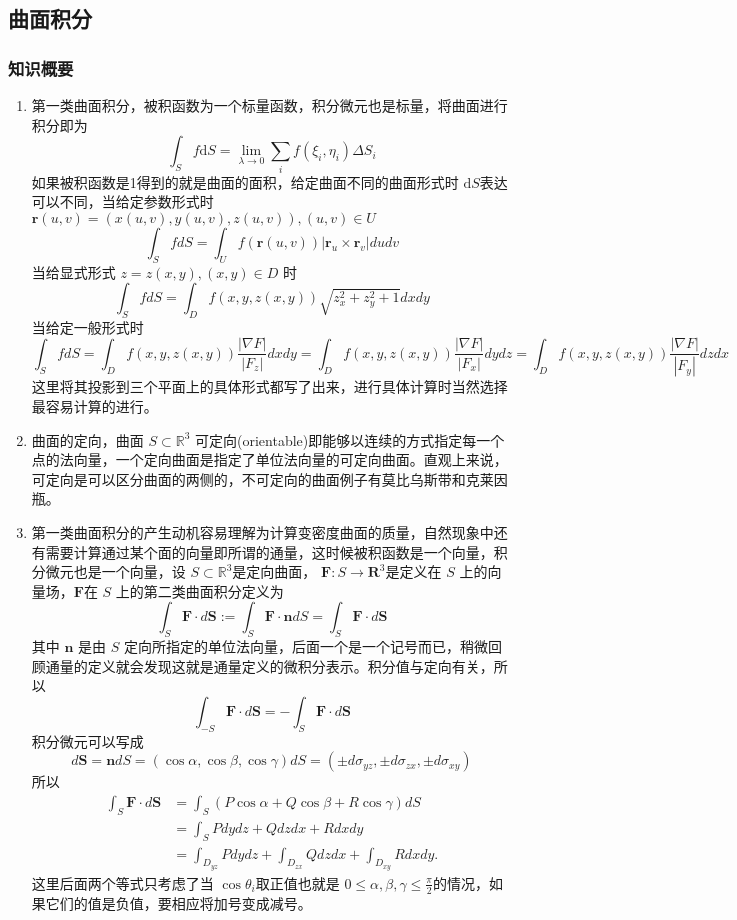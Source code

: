 \subsection{曲面积分}
\subsubsection{知识概要}
\begin{enumerate}
    \item 第一类曲面积分，被积函数为一个标量函数，积分微元也是标量，将曲面进行积分即为
    \[
        \int _S f \mathrm{d} S = \lim_{\lambda\to 0}\sum_if(\xi_i,\eta_i)\Delta S_i
    \]
    如果被积函数是1得到的就是曲面的面积，给定曲面不同的曲面形式时 $\mathrm{d} S$表达可以不同，当给定参数形式时 $\mathbf{r}(u,v)=(x(u,v),y(u,v),z(u,v)),(u,v)\in U$
    \[
        \int _S f dS=\int_Uf(\mathbf{r}(u,v))|\mathbf{r}_u\times\mathbf{r}_v|dudv
    \]
    当给显式形式 $z = z(x,y), (x,y) \in D$ 时
    \[
        \int_SfdS=\int_Df(x,y,z(x,y))\sqrt{z_x^2+z_y^2+1}dxdy
    \]
    当给定一般形式时
    \[
        \int _SfdS=\int_Df(x,y,z(x,y))\frac{|\nabla F|}{|F_z|}dxdy =\int_Df(x,y,z(x,y))\frac{|\nabla F|}{|F_x|}dydz =\int _Df(x,y,z(x,y))\frac{|\nabla F|}{|F_y|}dzdx  
    \]
    这里将其投影到三个平面上的具体形式都写了出来，进行具体计算时当然选择最容易计算的进行。

    \item 曲面的定向，曲面 $S \subset \mathbb{R}^3$ 可定向(orientable)即能够以连续的方式指定每一个点的法向量，一个定向曲面是指定了单位法向量的可定向曲面。直观上来说，可定向是可以区分曲面的两侧的，不可定向的曲面例子有莫比乌斯带和克莱因瓶。

    \item 第一类曲面积分的产生动机容易理解为计算变密度曲面的质量，自然现象中还有需要计算通过某个面的向量即所谓的通量，这时候被积函数是一个向量，积分微元也是一个向量，设 $S \subset \mathbb{R}^3$是定向曲面， $\mathbf{F}: S \to \mathbf{R}^3$是定义在 $S$ 上的向量场，$\mathbf{F}$在 $S$ 上的第二类曲面积分定义为
    \[
        \int_S\mathbf{F}\cdot d\mathbf{S}:=\int_S\mathbf{F}\cdot\mathbf{n}dS = \int _S \mathbf{F} \cdot d \mathbf{S}
    \]
    其中 $\mathbf{n}$ 是由 $S$ 定向所指定的单位法向量，后面一个是一个记号而已，稍微回顾通量的定义就会发现这就是通量定义的微积分表示。积分值与定向有关，所以
    \[
        \int_{-S}\mathbf{F}\cdot d\mathbf{S}=-\int_S\mathbf{F}\cdot d\mathbf{S}
    \]
    积分微元可以写成
    \[
        d\mathbf{S}=\mathbf{n}dS=(\cos\alpha,\cos\beta,\cos\gamma)dS=(\pm d\sigma_{yz},\pm d\sigma_{zx},\pm d\sigma_{xy})
    \]
    所以
    \begin{align*}
    \int_{S}\mathbf{F}\cdot d\mathbf{S}& =\int_{S}(P\cos\alpha+Q\cos\beta+R\cos\gamma)dS \\
    &=\int_SPdydz+Qdzdx+Rdxdy \\
    &=\int_{D_{yz}}Pdydz+\int_{D_{zx}}Qdzdx+\int_{D_{xy}}Rdxdy.
    \end{align*}
    这里后面两个等式只考虑了当 $\cos \theta _i$取正值也就是 $0 \le \alpha, \beta, \gamma \le \frac{\pi}{2} $的情况，如果它们的值是负值，要相应将加号变成减号。
\end{enumerate}

